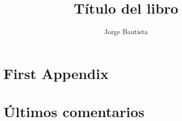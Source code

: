 \documentclass[10pt,letterpaper]{book}
\title{T\'itulo del libro}
\author{Jorge Bautista}
\begin{document}
    \frontmatter
    \maketitle
    
    \mainmatter
    
    
    
    \appendix    
    \chapter{First Appendix}

    \backmatter
    \chapter{\'Ultimos comentarios}
    \nocite{*}
\end{document}

